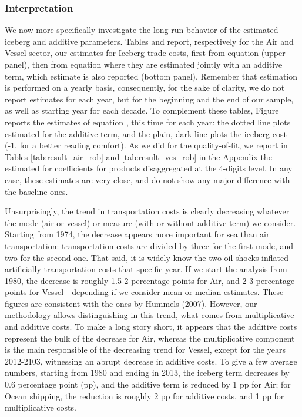 \documentclass[a4paper,11pt]{article}
\begin{document}
\subsubsection{Interpretation}

We now more specifically investigate the long-run behavior of the estimated iceberg and additive parameters. Tables\label{tab:result_air} and \label{tab:result_ves} report, respectively for the Air and Vessel sector, our estimates for Iceberg trade costs, first from equation \label{eq:iceberg} (upper panel), then from equation \label{eq:estimatedequation} where they are estimated jointly with an additive term, which estimate is also reported (bottom panel). Remember that estimation is performed on a yearly basis, consequently, for the sake of clarity, we do not report estimates for each year, but for the beginning and the end of our sample, as well as starting year for each decade. To complement these tables, Figure\label{fig:mult_vs_add} reports the estimates of equation \label{eq:estimatedequation}, this time for each year: the dotted line plots estimated for the additive term, and the plain, dark line plots the iceberg cost (-1, for a better reading comfort). As we did for the quality-of-fit, we report in Tables \ref{tab:result_air_rob} and \ref{tab:result_ves_rob} in the Appendix the estimated for coefficients for products disaggregated at the 4-digits level. In any case, these estimates are very close, and do not show any major difference with the baseline ones.

Unsurprisingly, the trend in transportation costs is clearly decreasing whatever the mode (air or vessel) or measure (with or without additive term) we consider. Starting from 1974, the decrease appears more important for sea than air transportation: transportation costs are divided by three for the first mode, and two for the second one. That said, it is widely know the two oil shocks inflated artificially transportation costs that specific year. If we start the analysis from 1980, the decrease is roughly 1.5-2 percentage points for Air, and 2-3 percentage points for Vessel - depending if we consider mean or median estimates. These figures are consistent with the ones by Hummels (2007). However, our methodology allows distinguishing in this trend, what comes from multiplicative and additive costs. To make a long story short, it appears that the additive costs represent the bulk of the decrease for Air, whereas the multiplicative component is the main responsible of the decreasing trend for Vessel, except for the years 2012-2103, witnessing an abrupt decrease in additive costs. To give a few average numbers, starting from 1980 and ending in 2013, the iceberg term decreases by 0.6 percentage point (pp), and the additive term is reduced by 1 pp for Air; for Ocean shipping, the reduction is roughly 2 pp for additive costs, and 1 pp for multiplicative costs. 
\end{document}
